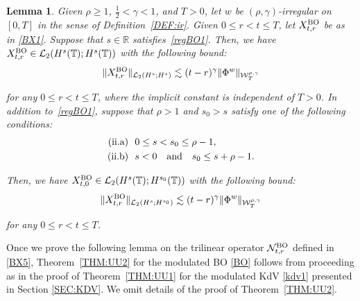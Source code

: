 \documentclass[letterpaper, 11pt,  reqno]{amsart}
\newtheorem{lemma}[theorem]{Lemma}
\newcommand{\1}{\hspace{0.5mm}\text{I}\hspace{0.5mm}}
\newcommand{\noi}{\noindent}
\newcommand{\R}{\mathbb{R}}
\newcommand{\T}{\mathbb{T}}
\renewcommand{\L}{\mathcal{L}}
\newcommand{\g}{\gamma}
\newcommand{\les}{\lesssim}
\newcommand{\NN}{\mathcal{N}}
\newcommand{\W}{\mathcal{W}}
\newcommand{\BO}{\text{\rm BO} }
\numberwithin{equation}{section}
\numberwithin{theorem}{section}
\begin{document}
\begin{lemma}\label{LEM:nonlin3}
Given $\rho \ge 1$,  $\frac12< \g < 1$, and $T> 0$, 
let  $w$ be $(\rho,\g)$-irregular on $[0, T]$ in the sense of Definition~\ref{DEF:ir}.
Given $0 \le r < t \le T$, let $X^\BO_{t, r}$
be as in \eqref{BX1}.
Suppose that $s \in \R$ satisfies~\eqref{regBO1}.
Then, 
we have $X_{t, r}^\BO \in \L_2(H^s(\T); H^{s}(\T))$
with the following bound\textup{:}
\begin{align*}
 \|X^\BO_{t, r}\|_{\L_2(H^s; H^{s})}
\les 
(t-r)^\g  \|\Phi^w\|_{  \W^{\rho,\g}_T}
\end{align*}

\noi
for any $0 \le r < t \le T$, 
where the implicit constant is independent of $T > 0$.
In addition to~\eqref{regBO1}, suppose that 
$\rho  > 1$ and $s_0 > s$ satisfy
one of the following conditions\textup{:}
\begin{align*}
\textup{(ii.a)} &\ \
0 \le s < s_0 \le \rho - 1,\\
\textup{(ii.b)} &\ \
 s <0
\quad 
\text{and}\quad 
s_0 \le s + \rho - 1.
\end{align*}




\noi
Then, 
we have 
$X^\BO_{t, 0} \in \L_2(H^s(\T); H^{s_0}(\T))$
with the following bound\textup{:}
\begin{align*}
 \|X^\BO_{t, r}\|_{\L_2(H^s; H^{s_0})}
\les 
(t- r)^\g  \|\Phi^w\|_{  \W^{\rho,\g}_T}
\end{align*}

\noi
for any $0 \le r < t \le T$.



\end{lemma}



Once we prove the following lemma
on the trilinear operator $\NN_{t, r}^\BO$
defined in \eqref{BX5},
Theorem~\ref{THM:UU2} 
for the modulated BO \eqref{BO} follows
from proceeding as in 
the proof of Theorem~\ref{THM:UU1}
for the modulated KdV \eqref{kdv1}
presented in Section \ref{SEC:KDV}.
We omit details of the proof of 
Theorem~\ref{THM:UU2}.
\end{document}
